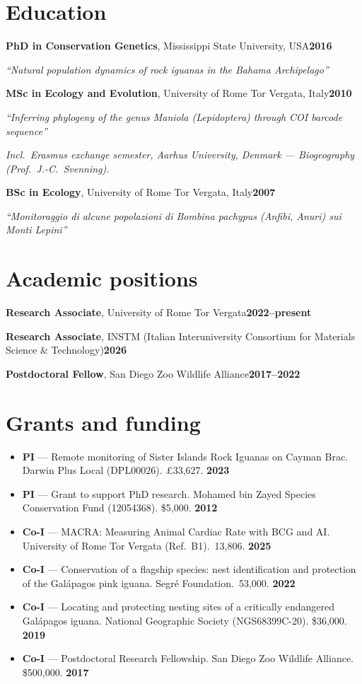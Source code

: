 \documentclass[11pt]{article}
\newcommand{\entry}[2]{\noindent#1\hfill\textbf{#2}\par}
\begin{document}
\section*{Education}
\entry{\textbf{PhD in Conservation Genetics}, Mississippi State University, USA}{2016}
\noindent\emph{``Natural population dynamics of rock iguanas in the Bahama Archipelago''}\par
\vspace{0.4em}
\entry{\textbf{MSc in Ecology and Evolution}, University of Rome Tor Vergata, Italy}{2010}
\noindent\emph{``Inferring phylogeny of the genus Maniola (Lepidoptera) through COI barcode sequence''}\par
\noindent\emph{Incl.\ Erasmus exchange semester, Aarhus University, Denmark --- Biogeography (Prof.\ J.-C.\ Svenning).}\par
\vspace{0.4em}
\entry{\textbf{BSc in Ecology}, University of Rome Tor Vergata, Italy}{2007}
\noindent\emph{``Monitoraggio di alcune popolazioni di Bombina pachypus (Anfibi, Anuri) sui Monti Lepini''}\par

\section*{Academic positions}
\entry{\textbf{Research Associate}, University of Rome Tor Vergata}{2022--present}
\entry{\textbf{Research Associate}, INSTM (Italian Interuniversity Consortium for Materials Science \& Technology)}{2026}
\entry{\textbf{Postdoctoral Fellow}, San Diego Zoo Wildlife Alliance}{2017--2022}

\section*{Grants and funding}
\begin{itemize}[leftmargin=1.4em,itemsep=3pt]
\item \textbf{PI} --- Remote monitoring of Sister Islands Rock Iguanas on Cayman Brac. Darwin Plus Local (DPL00026). \pounds33,627. \hfill \textbf{2023}
\item \textbf{PI} --- Grant to support PhD research. Mohamed bin Zayed Species Conservation Fund (12054368). \$5,000. \hfill \textbf{2012}
\item \textbf{Co-I} --- MACRA: Measuring Animal Cardiac Rate with BCG and AI. University of Rome Tor Vergata (Ref.\ B1). \texteuro\,13,806. \hfill \textbf{2025}
\item \textbf{Co-I} --- Conservation of a flagship species: nest identification and protection of the Gal\'apagos pink iguana. Segr\'e Foundation. \texteuro\,53,000. \hfill \textbf{2022}
\item \textbf{Co-I} --- Locating and protecting nesting sites of a critically endangered Gal\'apagos iguana. National Geographic Society (NGS68399C-20). \$36,000. \hfill \textbf{2019}
\item \textbf{Co-I} --- Postdoctoral Research Fellowship. San Diego Zoo Wildlife Alliance. \$500,000. \hfill \textbf{2017}
\end{itemize}
\end{document}
